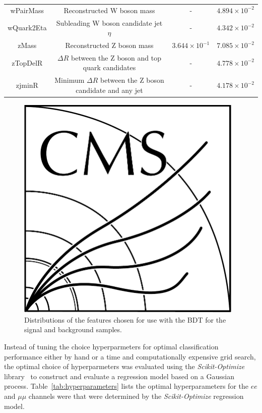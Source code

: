 \begin{table}[htbp]
{\begin{tabular}{cccc}
    wPairMass & Reconstructed W boson mass & -  & $4.894 \times 10^{-2}$  \\
    wQuark2Eta & Subleading W boson candidate jet $\eta$ & - & $4.342 \times 10^{-2}$ \\
    zMass & Reconstructed Z boson mass & $3.644 \times 10^{-1}$  & $7.085 \times 10^{-2}$  \\
    zTopDelR & $\Delta R$ between the Z boson and top quark candidates & - & $4.778 \times 10^{-2}$ \\
    zjminR & Minimum $\Delta R$ between the Z boson candidate and any jet & - & $4.178 \times 10^{-2}$ \\
   \hline
 \end{tabular}}
\end{table}

\begin{figure}[htbp]
\centering
\includegraphics[width=0.97\textwidth]{CMS-bw-logo.pdf}
\caption{
Distributions of the features chosen for use with the BDT for the signal and background samples.}
\label{fig:inputFeaturesDistributions}
\end{figure}

Instead of tuning the choice hyperparmeters for optimal classification performance either by hand or a time and computationally expensive grid search, the optimal choice of hyperparmeters was evaluated using the \emph{Scikit-Optimize} library~\cite{scikit-optimise} to construct and evaluate a regression model based on a Gaussian process.
Table~\ref{tab:hyperparameters} lists the optimal hyperparameters for the $ee$ and $\mu\mu$ channels were that were determined by the \emph{Scikit-Optimize} regression model.

